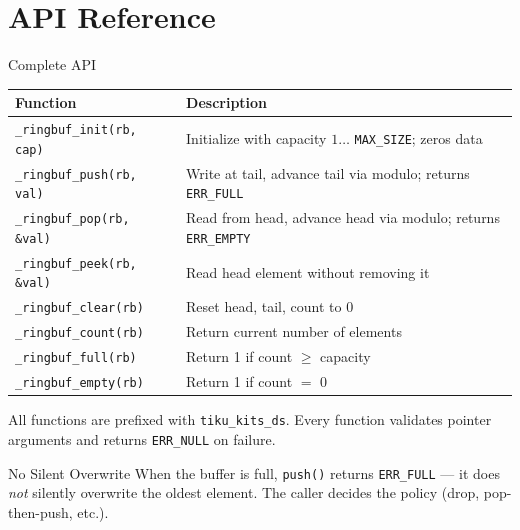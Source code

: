 \documentclass[aspectratio=169, 10pt]{beamer}
\begin{document}
\section{API Reference}

\begin{frame}[fragile]{Complete API}
\begin{table}
\centering
\small
\begin{tabular}{@{}lp{8cm}@{}}
\toprule
\textbf{Function} & \textbf{Description} \\
\midrule
\texttt{\_ringbuf\_init(rb, cap)}
  & Initialize with capacity $1 \ldots$ \texttt{MAX\_SIZE}; zeros data \\
\texttt{\_ringbuf\_push(rb, val)}
  & Write at tail, advance tail via modulo; returns \texttt{ERR\_FULL} \\
\texttt{\_ringbuf\_pop(rb, \&val)}
  & Read from head, advance head via modulo; returns \texttt{ERR\_EMPTY} \\
\texttt{\_ringbuf\_peek(rb, \&val)}
  & Read head element without removing it \\
\midrule
\texttt{\_ringbuf\_clear(rb)}
  & Reset head, tail, count to 0 \\
\texttt{\_ringbuf\_count(rb)}
  & Return current number of elements \\
\texttt{\_ringbuf\_full(rb)}
  & Return 1 if count $\geq$ capacity \\
\texttt{\_ringbuf\_empty(rb)}
  & Return 1 if count $=$ 0 \\
\bottomrule
\end{tabular}
\end{table}

\vspace{0.3em}
{\scriptsize All functions are prefixed with \texttt{tiku\_kits\_ds}.
Every function validates pointer arguments and returns \texttt{ERR\_NULL} on failure.}

\begin{alertblock}{No Silent Overwrite}
When the buffer is full, \texttt{push()} returns \texttt{ERR\_FULL} --- it
does \emph{not} silently overwrite the oldest element. The caller decides
the policy (drop, pop-then-push, etc.).
\end{alertblock}
\end{frame}

\end{document}
